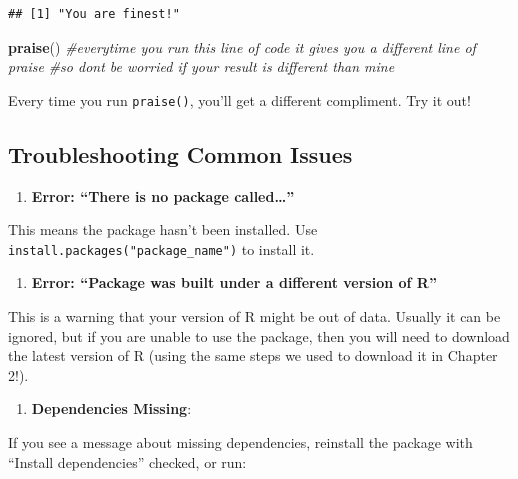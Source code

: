 \documentclass[
]{book}
\newenvironment{Shaded}{\begin{snugshade}}{\end{snugshade}}
\newcommand{\CommentTok}[1]{\textcolor[rgb]{0.56,0.35,0.01}{\textit{#1}}}
\newcommand{\FunctionTok}[1]{\textcolor[rgb]{0.13,0.29,0.53}{\textbf{#1}}}
\newcommand{\NormalTok}[1]{#1}
\providecommand{\tightlist}{%
  \setlength{\itemsep}{0pt}\setlength{\parskip}{0pt}}
\begin{document}
\begin{verbatim}
## [1] "You are finest!"
\end{verbatim}

\begin{Shaded}
\begin{Highlighting}[]
\FunctionTok{praise}\NormalTok{() }\CommentTok{\#everytime you run this line of code it gives you a different line of praise}
\CommentTok{\#so don\textquotesingle{}t be worried if your result is different than mine}
\end{Highlighting}
\end{Shaded}

Every time you run \texttt{praise()}, you'll get a different compliment. Try it out!

\subsection{Troubleshooting Common Issues}\label{troubleshooting-common-issues}

\begin{enumerate}
\def\labelenumi{\arabic{enumi}.}
\tightlist
\item
  \textbf{Error: ``There is no package called\ldots{}''}
\end{enumerate}

This means the package hasn't been installed. Use \texttt{install.packages("package\_name")} to install it.

\begin{enumerate}
\def\labelenumi{\arabic{enumi}.}
\setcounter{enumi}{1}
\tightlist
\item
  \textbf{Error: ``Package was built under a different version of R''}
\end{enumerate}

This is a warning that your version of R might be out of data. Usually it can be ignored, but if you are unable to use the package, then you will need to download the latest version of R (using the same steps we used to download it in Chapter 2!).

\begin{enumerate}
\def\labelenumi{\arabic{enumi}.}
\setcounter{enumi}{2}
\tightlist
\item
  \textbf{Dependencies Missing}:
\end{enumerate}

If you see a message about missing dependencies, reinstall the package with ``Install dependencies'' checked, or run:
\end{document}
